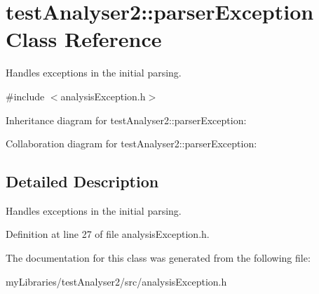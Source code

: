 \hypertarget{classtestAnalyser2_1_1parserException}{}\section{test\+Analyser2\+::parser\+Exception Class Reference}
\label{classtestAnalyser2_1_1parserException}


Handles exceptions in the initial parsing.  




{\ttfamily \#include $<$analysis\+Exception.\+h$>$}



Inheritance diagram for test\+Analyser2\+::parser\+Exception\+:


Collaboration diagram for test\+Analyser2\+::parser\+Exception\+:


\subsection{Detailed Description}
Handles exceptions in the initial parsing. 

Definition at line 27 of file analysis\+Exception.\+h.



The documentation for this class was generated from the following file\+:\begin{DoxyCompactItemize}
\item 
my\+Libraries/test\+Analyser2/src/analysis\+Exception.\+h\end{DoxyCompactItemize}
